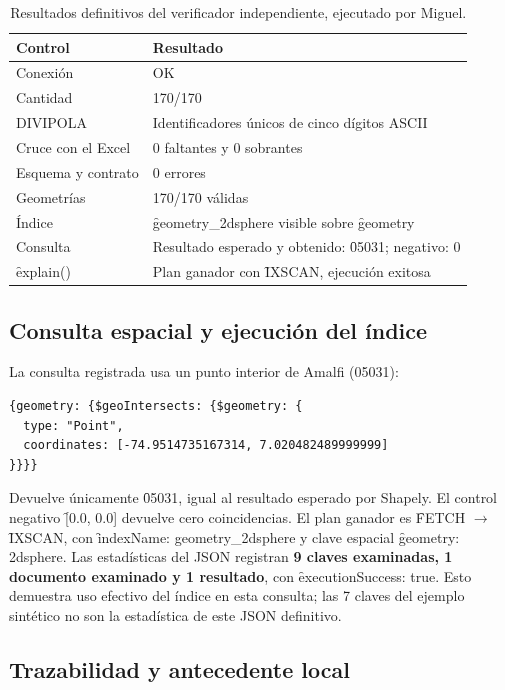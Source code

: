 \begin{table}[htbp]
\centering\small
\caption{Resultados definitivos del verificador independiente, ejecutado por Miguel.}
\begin{tabularx}{\textwidth}{@{}P{4.2cm} L@{}}
\toprule
Control & Resultado \\
\midrule
Conexión & OK \\
Cantidad & 170/170 \\
DIVIPOLA & Identificadores únicos de cinco dígitos ASCII \\
Cruce con el Excel & 0 faltantes y 0 sobrantes \\
Esquema y contrato & 0 errores \\
Geometrías & 170/170 válidas \\
Índice & \f{geometry\_2dsphere} visible sobre \f{geometry} \\
Consulta & Resultado esperado y obtenido: \f{05031}; negativo: 0 \\
\f{explain()} & Plan ganador con \f{IXSCAN}, ejecución exitosa \\
\bottomrule
\end{tabularx}
\end{table}

\subsection{Consulta espacial y ejecución del índice}

La consulta registrada usa un punto interior de Amalfi (05031):
\begin{verbatim}
{geometry: {$geoIntersects: {$geometry: {
  type: "Point",
  coordinates: [-74.9514735167314, 7.020482489999999]
}}}}
\end{verbatim}
Devuelve únicamente \f{05031}, igual al resultado esperado por Shapely. El control negativo \f{[0.0, 0.0]} devuelve cero coincidencias. El plan ganador es \f{FETCH} $\rightarrow$ \f{IXSCAN}, con \f{indexName: geometry\_2dsphere} y clave espacial \f{geometry: 2dsphere}. Las estadísticas del JSON registran \textbf{9 claves examinadas, 1 documento examinado y 1 resultado}, con \f{executionSuccess: true}. Esto demuestra uso efectivo del índice en esta consulta; las 7 claves del ejemplo sintético no son la estadística de este JSON definitivo.

\subsection{Trazabilidad y antecedente local}

